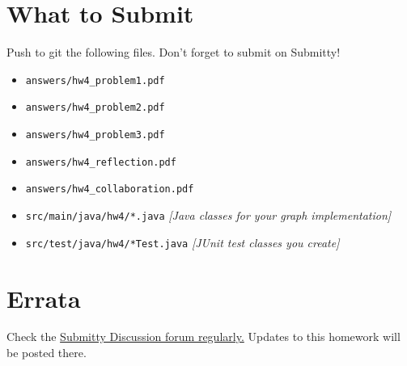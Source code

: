 \documentclass[11pt]{article}
\begin{document}
\section*{What to Submit}
Push to git the following files. Don't forget to submit on Submitty!
\begin{itemize}
\item \texttt{answers/hw4\_problem1.pdf}
\item \texttt{answers/hw4\_problem2.pdf}
\item \texttt{answers/hw4\_problem3.pdf}
\item \texttt{answers/hw4\_reflection.pdf}
\item \texttt{answers/hw4\_collaboration.pdf}
\item \texttt{src/main/java/hw4/*.java} \textit{[Java classes for your graph implementation]}
\item \texttt{src/test/java/hw4/*Test.java} \textit{[JUnit test classes you create]}
\end{itemize}

\section*{Errata}
Check the \href{https://submitty.cs.rpi.edu/courses/s23/csci2600/forum}{Submitty Discussion forum regularly.} Updates to this homework will be posted there.
\end{document}
